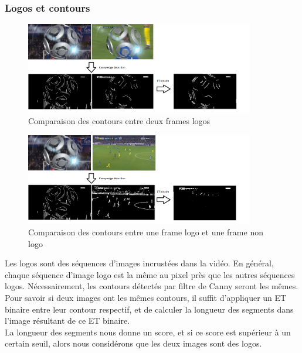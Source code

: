 \documentclass[11pt]{article}
\begin{document}
\subsubsection{Logos et contours}
\label{sec:orgf81f564}
\begin{figure}[htbp]
\centering
\includegraphics[width=10cm]{comparison_idea.png}
\caption{Comparaison des contours entre deux frames logos}
\end{figure}
\begin{figure}[htbp]
\centering
\includegraphics[width=10cm]{comparison_idea2.png}
\caption{Comparaison des contours entre une frame logo et une frame non logo}
\end{figure}

Les logos sont des séquences d'images incrustées dans la vidéo. En général, chaque séquence d'image logo est la même au pixel près que les autres séquences logos. Nécessairement, les contours détectés par filtre de Canny seront les mêmes. Pour savoir si deux images ont les mêmes contours, il suffit d'appliquer un ET binaire entre leur contour respectif, et de calculer la longueur des segments dans l'image résultant de ce ET binaire.\\
La longueur des segments nous donne un score, et si ce score est supérieur à un certain seuil, alors nous considérons que les deux images sont des logos.\\
\end{document}
